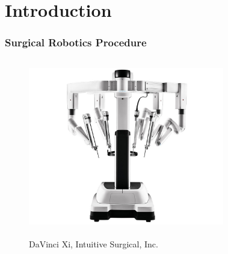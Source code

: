 \section{Introduction}

\begin{frame}
\frametitle{Surgical Robotics Procedure}
\begin{columns}
\begin{center}
\begin{figure}[htbp]
\centering
\includegraphics[width=\textwidth]{../images/intuitive-da-vinci-xi-patient-cart-front-view-1060867-lo-res.jpg}\\
\caption{DaVinci Xi, \textsuperscript {} Intuitive Surgical, Inc.}
\end{figure}
\end{center}
\begin{center}
\begin{figure}[htbp]
\centering

\end{figure}
\end{center}
\end{columns}
\end{frame}
